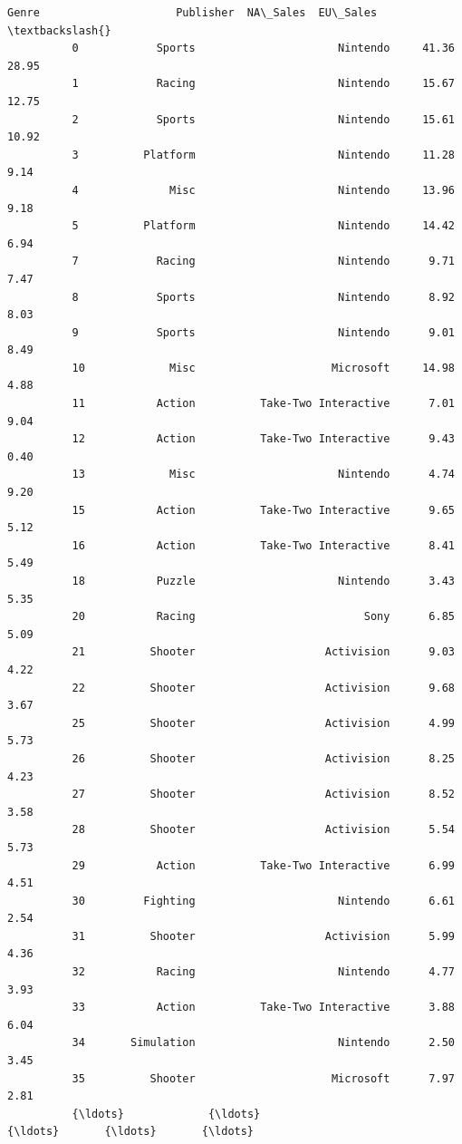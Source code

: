 \documentclass[11pt]{article}
\begin{document}
\begin{Verbatim}[commandchars=\\\{\}]
                        Genre                     Publisher  NA\_Sales  EU\_Sales  \textbackslash{}
          0            Sports                      Nintendo     41.36     28.95   
          1            Racing                      Nintendo     15.67     12.75   
          2            Sports                      Nintendo     15.61     10.92   
          3          Platform                      Nintendo     11.28      9.14   
          4              Misc                      Nintendo     13.96      9.18   
          5          Platform                      Nintendo     14.42      6.94   
          7            Racing                      Nintendo      9.71      7.47   
          8            Sports                      Nintendo      8.92      8.03   
          9            Sports                      Nintendo      9.01      8.49   
          10             Misc                     Microsoft     14.98      4.88   
          11           Action          Take-Two Interactive      7.01      9.04   
          12           Action          Take-Two Interactive      9.43      0.40   
          13             Misc                      Nintendo      4.74      9.20   
          15           Action          Take-Two Interactive      9.65      5.12   
          16           Action          Take-Two Interactive      8.41      5.49   
          18           Puzzle                      Nintendo      3.43      5.35   
          20           Racing                          Sony      6.85      5.09   
          21          Shooter                    Activision      9.03      4.22   
          22          Shooter                    Activision      9.68      3.67   
          25          Shooter                    Activision      4.99      5.73   
          26          Shooter                    Activision      8.25      4.23   
          27          Shooter                    Activision      8.52      3.58   
          28          Shooter                    Activision      5.54      5.73   
          29           Action          Take-Two Interactive      6.99      4.51   
          30         Fighting                      Nintendo      6.61      2.54   
          31          Shooter                    Activision      5.99      4.36   
          32           Racing                      Nintendo      4.77      3.93   
          33           Action          Take-Two Interactive      3.88      6.04   
          34       Simulation                      Nintendo      2.50      3.45   
          35          Shooter                     Microsoft      7.97      2.81   
          {\ldots}             {\ldots}                           {\ldots}       {\ldots}       {\ldots}   

\end{Verbatim}
\end{document}
